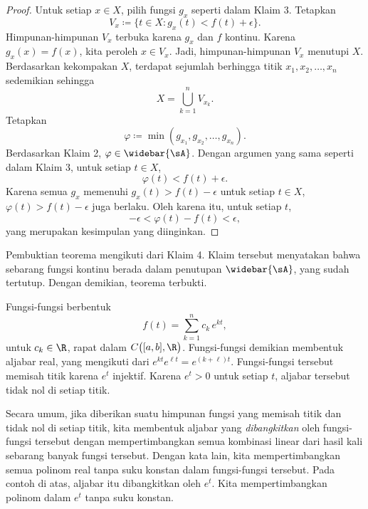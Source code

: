 \begin{proof}
Untuk setiap $x \in X$, pilih fungsi $g_x$ seperti dalam Klaim 3.
Tetapkan
\begin{equation*}
V_x \coloneqq \bigl\{ t \in X : g_x(t) < f(t) + \epsilon \bigr\}.
\end{equation*}
Himpunan-himpunan $V_x$ terbuka karena $g_x$ dan $f$ kontinu.
Karena $g_x(x) = f(x)$, kita peroleh $x \in V_x$. Jadi, himpunan-himpunan
$V_x$ menutupi $X$. Berdasarkan kekompakan $X$, terdapat sejumlah berhingga
titik $x_1,x_2,\ldots,x_n$ sedemikian sehingga
\begin{equation*}
X = \bigcup_{k=1}^n V_{x_k} .
\end{equation*}
Tetapkan
\begin{equation*}
\varphi \coloneqq \min(g_{x_1},g_{x_2},\ldots,g_{x_n}) .
\end{equation*}
Berdasarkan Klaim 2, $\varphi \in \widebar{\sA}$. Dengan argumen yang sama
seperti dalam Klaim 3, untuk setiap $t \in X$,
\begin{equation*}
\varphi(t) < f(t) + \epsilon .
\end{equation*}
Karena semua $g_x$ memenuhi $g_x(t) > f(t) - \epsilon$ untuk setiap $t \in X$,
$\varphi(t) > f(t) - \epsilon$ juga berlaku.
Oleh karena itu, untuk setiap $t$,
\begin{equation*}
-\epsilon < \varphi(t) - f(t) < \epsilon ,
\end{equation*}
yang merupakan kesimpulan yang diinginkan.
\end{proof}

Pembuktian teorema mengikuti dari Klaim 4. Klaim tersebut menyatakan bahwa
sebarang fungsi kontinu berada dalam penutupan $\widebar{\sA}$, yang sudah
tertutup. Dengan demikian, teorema terbukti.

\begin{example}
Fungsi-fungsi berbentuk
\begin{equation*}
f(t) = \sum_{k=1}^n c_k \, e^{kt},
\end{equation*}
untuk $c_k \in \R$,
rapat dalam $C\bigl([a,b],\R\bigr)$. Fungsi-fungsi demikian membentuk aljabar
real, yang mengikuti dari $e^{kt} e^{\ell t} = e^{(k+\ell)t}$. Fungsi-fungsi
tersebut memisah titik karena $e^t$ injektif.
Karena $e^t > 0$ untuk setiap $t$, aljabar tersebut
tidak nol di setiap titik.
\end{example}

Secara umum, jika diberikan suatu himpunan fungsi yang memisah titik dan tidak
nol di setiap titik, kita membentuk aljabar yang
\emph{dibangkitkan}
oleh fungsi-fungsi tersebut dengan mempertimbangkan semua kombinasi linear
dari hasil kali sebarang banyak fungsi tersebut. Dengan kata lain, kita mempertimbangkan semua
polinom real tanpa suku konstan dalam fungsi-fungsi tersebut. Pada contoh di
atas, aljabar itu dibangkitkan oleh $e^t$. Kita
mempertimbangkan polinom dalam $e^t$ tanpa suku konstan.

